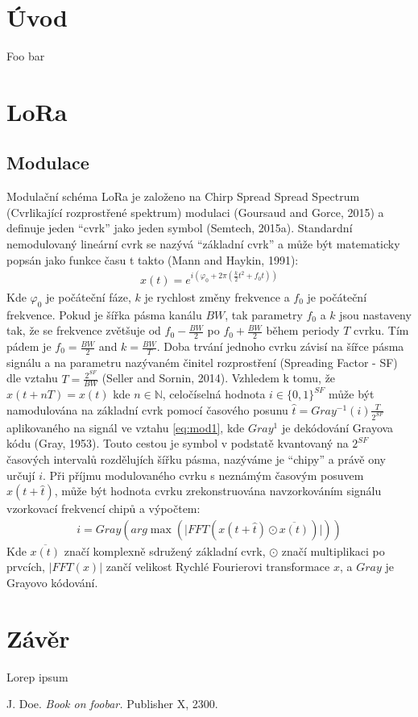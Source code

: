 \documentclass{ctuthesis}
\begin{document}
\maketitle

\chapter{Úvod}

Foo bar

\chapter{LoRa}
\section{Modulace}
Modulační schéma LoRa je založeno na Chirp Spread Spread Spectrum (Cvrlikající rozprostřené spektrum) modulaci  (Goursaud and Gorce, 2015) a definuje jeden “cvrk” jako jeden symbol  (Semtech, 2015a). Standardní nemodulovaný lineární cvrk se nazývá “základní cvrk” a může být matematicky popsán jako funkce času t takto (Mann and Haykin, 1991):
\begin{align}x(t)=e^{i(\varphi_{0}+2\pi(\frac{k}{2}t^{2} + f_{0}t))}
\label{eq:mod1}
\end{align}
Kde  $\varphi_{0}$ je počáteční fáze, $k$ je rychlost změny frekvence a $f_{0}$ je počáteční frekvence. Pokud je šířka pásma kanálu $BW$, tak parametry $f_{0}$ a $k$ jsou nastaveny tak, že se frekvence zvětšuje od $f_{0}-\frac{BW}{2}$ po $f_{0}+\frac{BW}{2}$ během periody $T$ cvrku. Tím pádem je $f_{0}=\frac{BW}{2}$ and $k = \frac{BW}{T}$. Doba trvání jednoho cvrku závisí na šířce pásma signálu a na parametru nazývaném činitel rozprostření (Spreading Factor - SF) dle vztahu $T = \frac{2^{SF}}{BW}$ (Seller and Sornin, 2014).
Vzhledem k tomu, že $x(t + nT) = x(t)$ kde $n\in \mathbb{N}$, celočíselná hodnota $i \in \{0, 1\}^{SF}$ může být namodulována na základní cvrk pomocí časového posunu $\hat{t} = Gray^{-1}(i)\frac{T}{2^{SF}}$ aplikovaného na signál ve vztahu \eqref{eq:mod1},  kde $Gray^{1}$ je dekódování Grayova kódu (Gray, 1953). Touto cestou je symbol v podstatě kvantovaný na $2^{SF}$ časových intervalů rozdělujích šířku pásma, nazýváme je “chipy” a právě ony určují $i$. Při příjmu modulovaného cvrku s neznámým časovým posuvem $x(t + \hat{t})$, může být hodnota cvrku zrekonstruována navzorkováním signálu vzorkovací frekvencí chipů a výpočtem:
\begin{align}i= Gray(arg \max (\lvert FFT(x(t+ \hat{t}) \odot \overline{x(t)}) \rvert ))
\label{eq:mod2}
\end{align}
Kde $\overline{x(t)}$ značí komplexně sdružený základní cvrk, $\odot$ značí multiplikaci po prvcích, $\lvert FFT(x) \rvert$ zančí velikost Rychlé Fourierovi transformace $x$, a $Gray$ je Grayovo kódování. 

\chapter{Závěr}

Lorep ipsum \cite{doe}

\begin{thebibliography}{1}

 J. Doe. \emph{Book on foobar.} Publisher X,
 2300.

\end{thebibliography}
\end{document}
